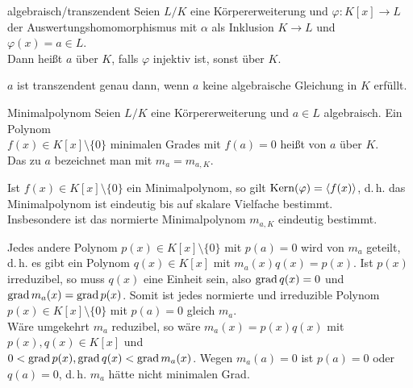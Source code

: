 \begin{Def}{algebraisch/transzendent}
    Seien $L/K$ eine Körpererweiterung und
    $\varphi\colon K[x] \rightarrow L$ der Auswertungshomomorphismus mit
    $\alpha$ als Inklusion $K \rightarrow L$ und $\varphi(x) = a \in L$.\\
    Dann heißt $a$  über $K$,
    falls $\varphi$ injektiv ist,
    sonst  über $K$.
\end{Def}

\begin{Bem}
    $a$ ist transzendent genau dann, wenn $a$ keine algebraische Gleichung
    in $K$ erfüllt.
\end{Bem}

\linie

\begin{Def}{Minimalpolynom}
    Seien $L/K$ eine Körpererweiterung und $a \in L$ algebraisch.
    Ein Polynom\\
    $f(x) \in K[x] \setminus \{0\}$ minimalen Grades mit
    $f(a) = 0$ heißt  von $a$ über $K$.\\
    Das  zu $a$ bezeichnet man mit
    $m_a = m_{a,K}$.
\end{Def}

\begin{Bem}
    Ist $f(x) \in K[x] \setminus \{0\}$ ein Minimalpolynom, so gilt
    $\operatorname{Kern}(\varphi) = \left\langle f(x)\right\rangle$, d.\,h. das Minimalpolynom ist
    eindeutig bis auf skalare Vielfache bestimmt.\\
    Insbesondere ist das normierte Minimalpolynom $m_{a,K}$ eindeutig
    bestimmt.
\end{Bem}

\begin{Bem}
    Jedes andere Polynom $p(x) \in K[x] \setminus \{0\}$
    mit $p(a) = 0$ wird von $m_a$ geteilt,
    d.\,h. es gibt ein Polynom $q(x) \in K[x]$ mit $m_a(x) q(x) = p(x)$.
    Ist $p(x)$ irreduzibel, so muss $q(x)$ eine Einheit sein, also
    $\operatorname{grad} q(x) = 0$ und $\operatorname{grad} m_a(x) = \operatorname{grad} p(x)$.
    Somit ist jedes normierte und irreduzible Polynom
    $p(x) \in K[x] \setminus \{0\}$ mit $p(a) = 0$ gleich $m_a$.\\
    Wäre umgekehrt $m_a$ reduzibel, so wäre $m_a(x) = p(x) q(x)$ mit
    $p(x), q(x) \in K[x]$ und\\
    $0 < \operatorname{grad} p(x), \operatorname{grad} q(x) < \operatorname{grad} m_a(x)$.
    Wegen $m_a(a) = 0$ ist $p(a) = 0$ oder $q(a) = 0$, d.\,h. $m_a$ hätte nicht
    minimalen Grad.
\end{Bem}

